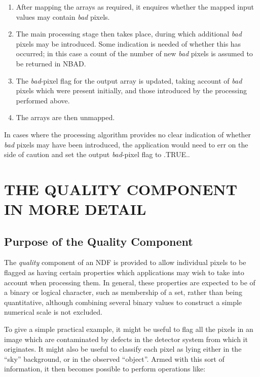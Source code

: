 \documentclass[twoside,11pt,nolof]{starlink}
\providecommand{\st}[1]{{\emph{#1}}}
\begin{document}
\begin{enumerate}

\item
After mapping the arrays as required, it enquires whether the mapped input
values may contain \st{bad\/} pixels.

\item
The main processing stage then takes place, during which additional
\st{bad\/} pixels may be introduced.
Some indication is needed of whether this has occurred; in this case a count
of the number of new \st{bad\/} pixels is assumed to be returned in NBAD.

\item
The \st{bad\/}-pixel flag for the output array is updated, taking account of
\st{bad\/} pixels which were present initially, and those introduced by the
processing performed above.

\item
The arrays are then unmapped.

\end{enumerate}

In cases where the processing algorithm provides no clear indication of
whether \st{bad\/} pixels may have been introduced, the application would need
to err on the side of caution and set the output \st{bad\/}-pixel flag to
.TRUE..


\section{THE QUALITY COMPONENT IN MORE DETAIL}

\subsection{Purpose of the Quality Component}

The \st{quality\/} component of an NDF is provided to allow individual pixels
to be flagged as having certain properties which applications may wish to take
into account when processing them.
In general, these properties are expected to be of a binary or logical
character, such as membership of a set, rather than being quantitative,
although combining several binary values to construct a simple numerical
scale is not excluded.

To give a simple practical example, it might be useful to flag all the
pixels in an image which are contaminated by defects in the detector system
from which it originates.
It might also be useful to classify each pixel as lying either in the
``sky'' background, or in the observed ``object''.
Armed with this sort of information, it then becomes possible to perform
operations like:
\end{document}
